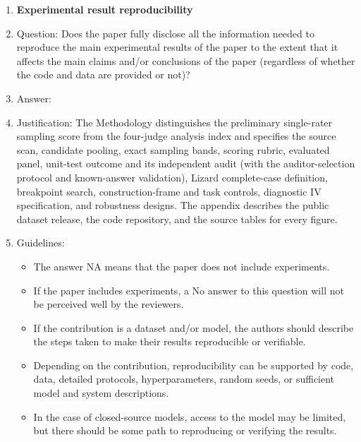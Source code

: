 \begin{enumerate}
\item {\bf Experimental result reproducibility}
    \item[] Question: Does the paper fully disclose all the information needed to reproduce the main experimental results of the paper to the extent that it affects the main claims and/or conclusions of the paper (regardless of whether the code and data are provided or not)?
    \item[] Answer: \answerYes{}
    \item[] Justification: The Methodology distinguishes the preliminary single-rater sampling score from the four-judge analysis index and specifies the source scan, candidate pooling, exact sampling bands, scoring rubric, evaluated panel, unit-test outcome and its independent audit (with the auditor-selection protocol and known-answer validation), Lizard complete-case definition, breakpoint search, construction-frame and task controls, diagnostic IV specification, and robustness designs. The appendix describes the public dataset release, the code repository, and the source tables for every figure.
    \item[] Guidelines:
    \begin{itemize}
        \item The answer NA means that the paper does not include experiments.
        \item If the paper includes experiments, a No answer to this question will not be perceived well by the reviewers.
        \item If the contribution is a dataset and/or model, the authors should describe the steps taken to make their results reproducible or verifiable.
        \item Depending on the contribution, reproducibility can be supported by code, data, detailed protocols, hyperparameters, random seeds, or sufficient model and system descriptions.
        \item In the case of closed-source models, access to the model may be limited, but there should be some path to reproducing or verifying the results.
    \end{itemize}


\end{enumerate}
